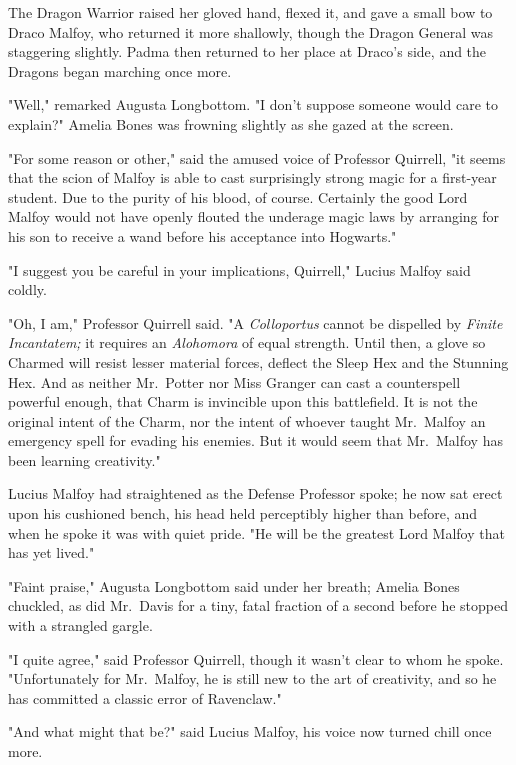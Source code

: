 The Dragon Warrior raised her gloved hand, flexed it, and gave a small bow to 
Draco Malfoy, who returned it more shallowly, though the Dragon General was 
staggering slightly. Padma then returned to her place at Draco's side, and the 
Dragons began marching once more.

"Well," remarked Augusta Longbottom. "I don't suppose someone would care to 
explain?" Amelia Bones was frowning slightly as she gazed at the screen.

"For some reason or other," said the amused voice of Professor Quirrell, "it 
seems that the scion of Malfoy is able to cast surprisingly strong magic for a 
first-year student. Due to the purity of his blood, of course. Certainly the 
good Lord Malfoy would not have openly flouted the underage magic laws by 
arranging for his son to receive a wand before his acceptance into Hogwarts."

"I suggest you be careful in your implications, Quirrell," Lucius Malfoy said 
coldly.

"Oh, I am," Professor Quirrell said. "A \emph{Colloportus} cannot be dispelled 
by \emph{Finite Incantatem;} it requires an \emph{Alohomora} of equal strength. 
Until then, a glove so Charmed will resist lesser material forces, deflect the 
Sleep Hex and the Stunning Hex. And as neither Mr.~Potter nor Miss Granger can 
cast a counterspell powerful enough, that Charm is invincible upon this 
battlefield. It is not the original intent of the Charm, nor the intent of 
whoever taught Mr.~Malfoy an emergency spell for evading his enemies. But it 
would seem that Mr.~Malfoy has been learning creativity."

Lucius Malfoy had straightened as the Defense Professor spoke; he now sat erect 
upon his cushioned bench, his head held perceptibly higher than before, and 
when he spoke it was with quiet pride. "He will be the greatest Lord Malfoy 
that has yet lived."

"Faint praise," Augusta Longbottom said under her breath; Amelia Bones 
chuckled, as did Mr.~Davis for a tiny, fatal fraction of a second before he 
stopped with a strangled gargle.

"I quite agree," said Professor Quirrell, though it wasn't clear to whom he 
spoke. "Unfortunately for Mr.~Malfoy, he is still new to the art of creativity, 
and so he has committed a classic error of Ravenclaw."

"And what might that be?" said Lucius Malfoy, his voice now turned chill once 
more.

